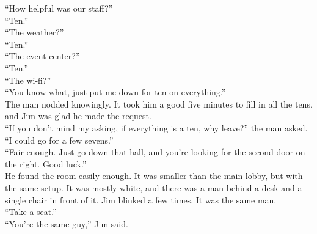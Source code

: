 \enquote{How helpful was our staff?}\\



\enquote{Ten.}\\



\enquote{The weather?}\\



\enquote{Ten.}\\



\enquote{The event center?}\\



\enquote{Ten.}\\



\enquote{The wi-fi?}\\



\enquote{You know what, just put me down for ten on everything.}\\



The man nodded knowingly.  It took him a good five minutes to fill in all the tens, and Jim was glad he made the request.\\



\enquote{If you don't mind my asking, if everything is a ten, why leave?} the man asked.\\



\enquote{I could go for a few sevens.}\\



\enquote{Fair enough.  Just go down that hall, and you're looking for the second door on the right.  Good luck.}\\



He found the room easily enough.  It was smaller than the main lobby, but with the same setup.  It was mostly white, and there was a man behind a desk and a single chair in front of it.  Jim blinked a few times.  It was the same man.\\



\enquote{Take a seat.}\\



\enquote{You're the same guy,} Jim said.\\



